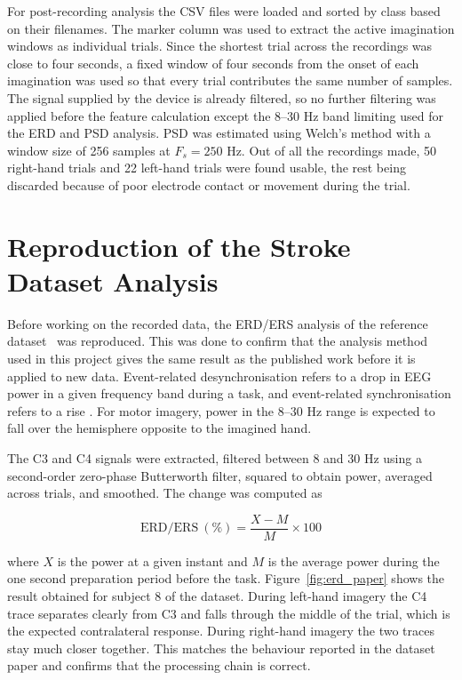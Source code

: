 For post-recording analysis the CSV files were loaded and sorted by class based on their
filenames. The marker column was used to extract the active imagination windows as
individual trials. Since the shortest trial across the recordings was close to four
seconds, a fixed window of four seconds from the onset of each imagination was used so that
every trial contributes the same number of samples. The signal supplied by the device is
already filtered, so no further filtering was applied before the feature calculation except
the 8--30 Hz band limiting used for the ERD and PSD analysis. PSD was estimated using
Welch's method \cite{welch1967} with a window size of 256 samples at $F_s = 250$ Hz. Out of all the
recordings made, 50 right-hand trials and 22 left-hand trials were found usable, the rest
being discarded because of poor electrode contact or movement during the trial.

\FloatBarrier

\section{Reproduction of the Stroke Dataset Analysis}
\label{sec:stroke_repro}

Before working on the recorded data, the ERD/ERS analysis of the reference
dataset~\cite{liu2024mi} was reproduced. This was done to confirm that the analysis method
used in this project gives the same result as the published work before it is applied to
new data. Event-related desynchronisation refers to a drop in EEG power in a given
frequency band during a task, and event-related synchronisation refers to a rise
\cite{pfurtscheller1999erd}. For motor
imagery, power in the 8--30 Hz range is expected to fall over the hemisphere opposite to
the imagined hand.

The C3 and C4 signals were extracted, filtered between 8 and 30 Hz using a second-order
zero-phase Butterworth filter, squared to obtain power, averaged across trials, and
smoothed. The change was computed as

\begin{equation}
\mathrm{ERD/ERS}~(\%) = \frac{X - M}{M} \times 100
\end{equation}

where $X$ is the power at a given instant and $M$ is the average power during the one
second preparation period before the task. Figure~\ref{fig:erd_paper} shows the result
obtained for subject 8 of the dataset. During left-hand imagery the C4 trace separates
clearly from C3 and falls through the middle of the trial, which is the expected
contralateral response. During right-hand imagery the two traces stay much closer together.
This matches the behaviour reported in the dataset paper and confirms that the processing
chain is correct.

